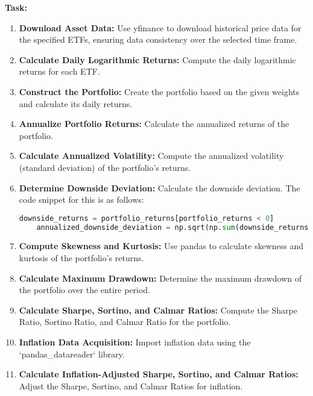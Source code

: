 \documentclass{article}
\begin{document}
\textbf{Task:}
\begin{enumerate}
    \item \textbf{Download Asset Data:} Use yfinance to download historical price data for the specified ETFs, ensuring data consistency over the selected time frame.
    
    \item \textbf{Calculate Daily Logarithmic Returns:} Compute the daily logarithmic returns for each ETF.
    
    \item \textbf{Construct the Portfolio:} Create the portfolio based on the given weights and calculate its daily returns.
    
    \item \textbf{Annualize Portfolio Returns:} Calculate the annualized returns of the portfolio.
    
    \item \textbf{Calculate Annualized Volatility:} Compute the annualized volatility (standard deviation) of the portfolio's returns.
    
    \item \textbf{Determine Downside Deviation:} Calculate the downside deviation. The code snippet for this is as follows:
    \begin{lstlisting}[language=Python]
    downside_returns = portfolio_returns[portfolio_returns < 0]
    annualized_downside_deviation = np.sqrt(np.sum(downside_returns**2) / len(downside_returns)) * np.sqrt(252)
    \end{lstlisting}

    \item \textbf{Compute Skewness and Kurtosis:} Use pandas to calculate skewness and kurtosis of the portfolio's returns.
    
    \item \textbf{Calculate Maximum Drawdown:} Determine the maximum drawdown of the portfolio over the entire period.
    
    \item \textbf{Calculate Sharpe, Sortino, and Calmar Ratios:} Compute the Sharpe Ratio, Sortino Ratio, and Calmar Ratio for the portfolio.
    
    \item \textbf{Inflation Data Acquisition:} Import inflation data using the `pandas\_datareader` library.
    
    \item \textbf{Calculate Inflation-Adjusted Sharpe, Sortino, and Calmar Ratios:} Adjust the Sharpe, Sortino, and Calmar Ratios for inflation.
    

\end{enumerate}
\end{document}
